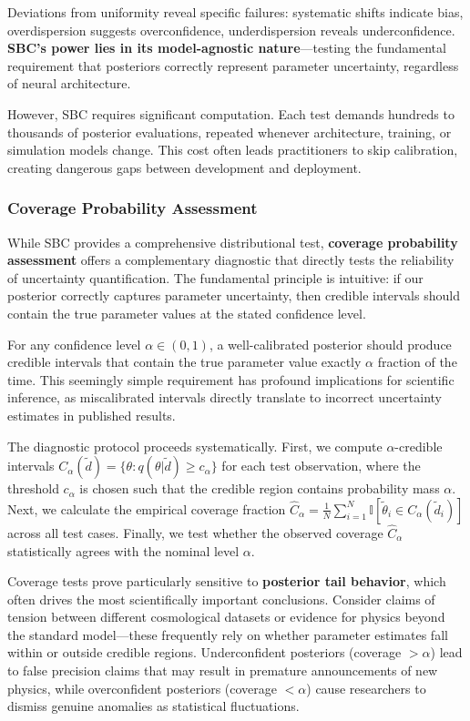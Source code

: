 \documentclass{SciPost}
\begin{document}
Deviations from uniformity reveal specific failures: systematic shifts indicate bias, overdispersion suggests overconfidence, underdispersion reveals underconfidence. \textbf{SBC's power lies in its model-agnostic nature}—testing the fundamental requirement that posteriors correctly represent parameter uncertainty, regardless of neural architecture.

However, SBC requires significant computation. Each test demands hundreds to thousands of posterior evaluations, repeated whenever architecture, training, or simulation models change. This cost often leads practitioners to skip calibration, creating dangerous gaps between development and deployment.

\subsubsection{Coverage Probability Assessment}

While SBC provides a comprehensive distributional test, \textbf{coverage probability assessment} offers a complementary diagnostic that directly tests the reliability of uncertainty quantification. The fundamental principle is intuitive: if our posterior correctly captures parameter uncertainty, then credible intervals should contain the true parameter values at the stated confidence level.

For any confidence level $\alpha \in (0,1)$, a well-calibrated posterior should produce credible intervals that contain the true parameter value exactly $\alpha$ fraction of the time. This seemingly simple requirement has profound implications for scientific inference, as miscalibrated intervals directly translate to incorrect uncertainty estimates in published results.

The diagnostic protocol proceeds systematically. First, we compute $\alpha$-credible intervals $C_\alpha(\tilde{d}) = \{\theta : q(\theta|\tilde{d}) \geq c_\alpha\}$ for each test observation, where the threshold $c_\alpha$ is chosen such that the credible region contains probability mass $\alpha$. Next, we calculate the empirical coverage fraction $\hat{C}_\alpha = \frac{1}{N} \sum_{i=1}^N \mathbb{I}[\tilde{\theta}_i \in C_\alpha(\tilde{d}_i)]$ across all test cases. Finally, we test whether the observed coverage $\hat{C}_\alpha$ statistically agrees with the nominal level $\alpha$.

Coverage tests prove particularly sensitive to \textbf{posterior tail behavior}, which often drives the most scientifically important conclusions. Consider claims of tension between different cosmological datasets or evidence for physics beyond the standard model—these frequently rely on whether parameter estimates fall within or outside credible regions. Underconfident posteriors (coverage $> \alpha$) lead to false precision claims that may result in premature announcements of new physics, while overconfident posteriors (coverage $< \alpha$) cause researchers to dismiss genuine anomalies as statistical fluctuations.
\end{document}
